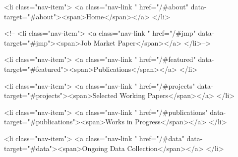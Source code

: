        <li class="nav-item">
          <a class="nav-link " href="/#about" data-target="#about"><span>Home</span></a>
        </li>



















    <!--    <li class="nav-item">
          <a class="nav-link " href="/#jmp" data-target="#jmp"><span>Job Market Paper</span></a>
        </li>-->






        <li class="nav-item">
          <a class="nav-link " href="/#featured" data-target="#featured"><span>Publications</span></a>
        </li>


























        <li class="nav-item">
          <a class="nav-link " href="/#projects" data-target="#projects"><span>Selected Working Papers</span></a>
        </li>


























        <li class="nav-item">
          <a class="nav-link " href="/#publications" data-target="#publications"><span>Works in Progress</span></a>
        </li>


        <li class="nav-item">
          <a class="nav-link " href="/#data" data-target="#data"><span>Ongoing Data Collection</span></a>
        </li>
























